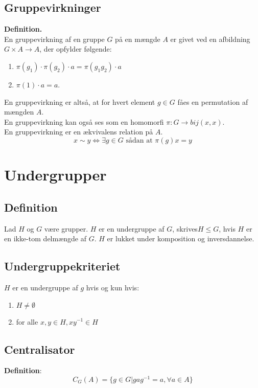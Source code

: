 \documentclass[11pt]{article}
\begin{document}
\subsection*{Gruppevirkninger}
\textbf{Definition.}\\
En gruppevirkning af en gruppe $G$ på en mængde $A$ er givet ved en afbildning $G \times A \to A$, der opfylder følgende:\\
\begin{enumerate}
  \item $\pi(g_1) \cdot \pi(g_2) \cdot a = \pi(g_1 g_2) \cdot a$\\
  \item $\pi(1) \cdot a = a$.
\end{enumerate}
En gruppevirkning er altså, at for hvert element $g \in G$ fåes en permutation af mængden $A$.\\
En gruppevirkning kan også ses som en homomorfi $\pi : G \to bij(x,x)$.\\
En gruppevirkning er en ækvivalens relation på $A$.\\
$$x \sim y \iff \exists{g \in G} \text{ sådan at } \pi(g)x = y$$

\section*{Undergrupper}

\subsection*{Definition}
Lad $H$ og $G$ være grupper. $H$ er en undergruppe af $G$, skrives$H \leq G$, hvis $H$ er en ikke-tom delmængde af $G$. $H$ er lukket under komposition og inversdannelse.



\subsection*{Undergruppekriteriet}

$H$ er en undergruppe af $g$ hvis og kun hvis:
\begin{enumerate}
  \item $H \neq \emptyset$\\
  \item for alle $x, y \in H, x y^{-1} \in H$
\end{enumerate}

\subsection*{Centralisator}
\textbf{Definition}:\\
$$C_G(A) = \{ g \in G | g a g^{-1} = a,  \forall{a} \in A \}$$
\end{document}
